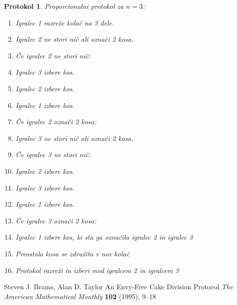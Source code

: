\documentclass[a4paper, 12pt]{article}
\newtheorem{protokol}{Protokol}
\begin{document}
	\begin{protokol}
		Proporcionalni protokol za $n = 3$:
		\begin{enumerate}
			
			\item Igralec 1 razreže kolač na 3 dele.
			
			\item Igralec 2 ne stori nič ali označi 2 kosa.
			
			\item[] Če igralec 2 ne stori nič:
		
			\setcounter{enumi}{2}
			
			\item \qquad Igralec 3 izbere kos.
			
			\item \qquad Igralec 2 izbere kos.
			
			\item \qquad Igralec 1 izbere kos.
			
			\item[] Če igralec 2 označi 2 kosa:

			\setcounter{enumi}{2}
			
			\item \qquad Igralec 3 ne stori nič ali označi 2 kosa.
			
			\item[] \qquad Če igralec 3 ne stori nič:
		
			\setcounter{enumi}{3}
			
			\item \qquad \qquad Igralec 2 izbere kos.
			
			\item \qquad \qquad Igralec 3 izbere kos.
			
			\item \qquad \qquad Igralec 1 izbere kos.
			
			\item[] \qquad Če igralec 3 označi 2 kosa:

			\setcounter{enumi}{3}
			
			\item \qquad \qquad Igralec 1 izbere kos, ki sta ga označila igralec 2 in igralec 3
			
			\item \qquad \qquad Preostala kosa se združita v nov kolač
			
			\item \qquad \qquad Protokol \textit{razreži in izberi} med igralcem 2 in igralcem 3
			
		\end{enumerate}
	\end{protokol}
	
	\pagebreak
	
	\begin{thebibliography}{5}
		
		Steven J. Brams, Alan D. Taylor
		An Envy-Free Cake Division Protocol
		\textit{The American Mathematical Monthly} \textbf{102} (1995), 9–18
		
	\end{thebibliography}
	
\end{document}

